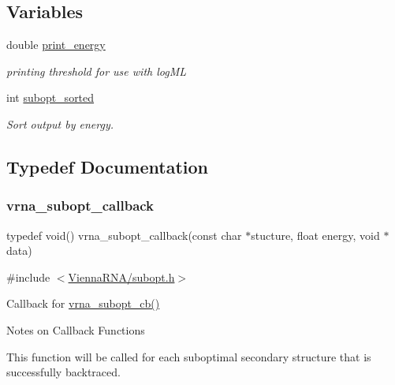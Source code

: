 \subsection*{Variables}
\begin{DoxyCompactItemize}
\item 
double \mbox{\hyperlink{group__subopt__wuchty_ga5e57d914bcb5feeecdf520e25313fcfe}{print\+\_\+energy}}
\begin{DoxyCompactList}\small\item\em printing threshold for use with log\+ML \end{DoxyCompactList}\item 
int \mbox{\hyperlink{group__subopt__wuchty_ga873cf8ed69e0437f8efa8b1fec854a0e}{subopt\+\_\+sorted}}
\begin{DoxyCompactList}\small\item\em Sort output by energy. \end{DoxyCompactList}\end{DoxyCompactItemize}


\subsection{Typedef Documentation}
\mbox{\label{group__subopt__wuchty_gaa0270c66d04f59e750401695b8282e04}} 
\subsubsection{\texorpdfstring{vrna\+\_\+subopt\+\_\+callback}{vrna\_subopt\_callback}}
{\footnotesize\ttfamily typedef void() vrna\+\_\+subopt\+\_\+callback(const char $\ast$stucture, float energy, void $\ast$data)}



{\ttfamily \#include $<$\mbox{\hyperlink{subopt_8h}{Vienna\+R\+N\+A/subopt.\+h}}$>$}



Callback for \mbox{\hyperlink{group__subopt__wuchty_ga1053837e6b6f158093508f8a70998352}{vrna\+\_\+subopt\+\_\+cb()}} 

\begin{DoxyRefDesc}{Notes on Callback Functions}
\item[\mbox{\hyperlink{callbacks__callbacks000009}{Notes on Callback Functions}}]This function will be called for each suboptimal secondary structure that is successfully backtraced. \end{DoxyRefDesc}


